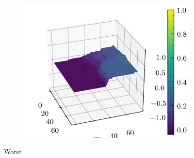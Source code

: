 \documentclass[../document.tex]{subfiles}
\begin{document}
\begin{figure}[H]
\begin{subfigure}[b]{0.19\textwidth}
        \includegraphics[width=\linewidth]{../img/5/quarry/worst/patch-3d-4.png}
    \end{subfigure}  

\caption{Worst}    
\end{figure}
\end{document}
